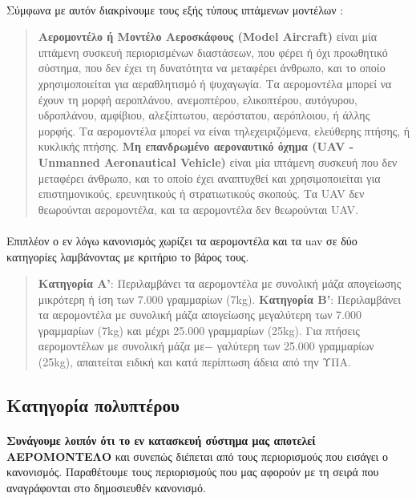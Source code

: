 \documentclass[a4paper, 12pt, twoside]{report}
\begin{document}
{{{{{{			\paragraph{}{Σύμφωνα με αυτόν διακρίνουμε τους εξής τύπους ιπτάμενων μοντέλων :
			\begin{quote}
				\textbf{Αερομοντέλο ή Μοντέλο Αεροσκάφους (Model Aircraft)} είναι μία ιπτάμενη συσκευή περιορισμένων διαστάσεων, που φέρει ή όχι προωθητικό σύστημα, που δεν έχει τη δυνατότητα να μεταφέρει άνθρωπο, και το οποίο χρησιμοποιείται για αεραθλητισμό ή ψυχαγωγία. Τα αερομοντέλα μπορεί να έχουν τη μορφή αεροπλάνου, ανεμοπτέρου, ελικοπτέρου, αυτόγυρου, υδροπλάνου, αμφίβιου, αλεξίπτωτου, αερόστατου, αερόπλοιου, ή άλλης μορφής. Τα αερομοντέλα μπορεί να είναι τηλεχειριζόμενα, ελεύθερης πτήσης, ή κυκλικής πτήσης.\linebreak
				\textbf{Μη επανδρωμένο αεροναυτικό όχημα (UAV - Unmanned Aeronautical Vehicle)} είναι μία ιπτάμενη συσκευή που δεν μεταφέρει άνθρωπο, και το οποίο έχει αναπτυχθεί και χρησιμοποιείται για επιστημονικούς, ερευνητικούς ή στρατιωτικούς σκοπούς. Τα UAV δεν θεωρούνται αερομοντέλα, και τα αερομοντέλα δεν θεωρούνται UAV.			
			\end{quote}
			}
			\paragraph{}{Επιπλέον ο εν λόγω κανονισμός χωρίζει τα αερομοντέλα και τα uav σε δύο κατηγορίες λαμβάνοντας με κριτήριο το βάρος τους.
			\begin{quote}
				\textbf{Κατηγορία Α'}: Περιλαμβάνει τα αερομοντέλα με συνολική μάζα απογείωσης μικρότερη ή ίση των 7.000 γραμμαρίων (7kg).\linebreak
				\textbf{Κατηγορία Β'}: Περιλαμβάνει τα αερομοντέλα με συνολική μάζα απογείωσης μεγαλύτερη των 7.000 γραμμαρίων (7kg) και μέχρι 25.000 γραμμαρίων (25kg).\linebreak
				Για πτήσεις αερομοντέλων με συνολική μάζα με−
γαλύτερη των 25.000 γραμμαρίων (25kg), απαιτείται ειδική και κατά περίπτωση άδεια από την ΥΠΑ.
			\end{quote}
			}
			
		\subsection{Κατηγορία πολυπτέρου}
			\paragraph{}{\textbf{Συνάγουμε λοιπόν ότι το εν κατασκευή σύστημα μας αποτελεί ΑΕΡΟΜΟΝΤΕΛΟ} και συνεπώς διέπεται από τους περιορισμούς που εισάγει ο κανονισμός. Παραθέτουμε τους περιορισμούς που μας αφορούν με τη σειρά που αναγράφονται στο δημοσιευθέν κανονισμό.
			}

}}}}}}
\end{document}
